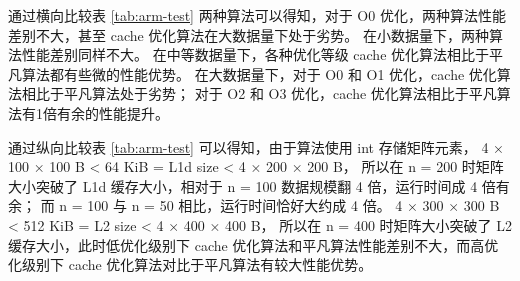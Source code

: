 \documentclass[a4paper]{article}
\begin{document}
通过横向比较表 \ref{tab:arm-test} 两种算法可以得知，对于 O0 优化，两种算法性能差别不大，甚至 cache 优化算法在大数据量下处于劣势。
在小数据量下，两种算法性能差别同样不大。
在中等数据量下，各种优化等级 cache 优化算法相比于平凡算法都有些微的性能优势。
在大数据量下，对于 O0 和 O1 优化，cache 优化算法相比于平凡算法处于劣势；
对于 O2 和 O3 优化，cache 优化算法相比于平凡算法有1倍有余的性能提升。

通过纵向比较表 \ref{tab:arm-test} 可以得知，由于算法使用 int 存储矩阵元素，
4 × 100 × 100 B < 64 KiB = L1d size < 4 × 200 × 200 B，
所以在 n = 200 时矩阵大小突破了 L1d 缓存大小，相对于 n = 100 数据规模翻 4 倍，运行时间成 4 倍有余；
而 n = 100 与 n = 50 相比，运行时间恰好大约成 4 倍。
4 × 300 × 300 B < 512 KiB = L2 size < 4 × 400 × 400 B，
所以在 n = 400 时矩阵大小突破了 L2 缓存大小，此时低优化级别下 cache 优化算法和平凡算法性能差别不大，而高优化级别下 cache 优化算法对比于平凡算法有较大性能优势。
\end{document}
